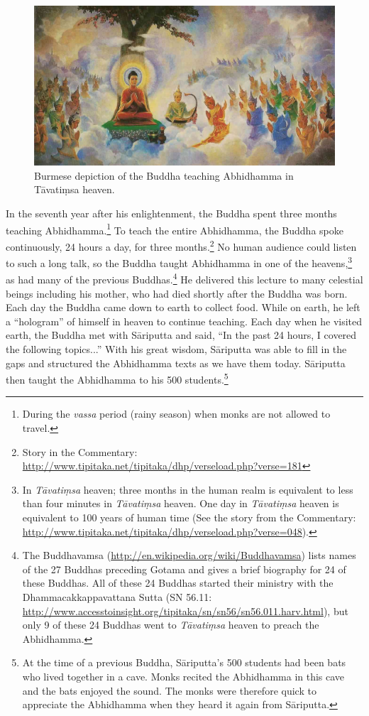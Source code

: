 \begin{figure}[h]
\centering
\includegraphics[width=0.9\linewidth]{./Diagrams/Tavatimsa}
\caption{Burmese depiction of the Buddha teaching Abhidhamma in Tāvatiṃsa heaven.}
\label{fig:Tavatimsa}
\end{figure}

In the seventh year after his enlightenment, the Buddha spent three months teaching Abhidhamma.\footnote{During the \textit{vassa} period (rainy season) when monks are not allowed to travel.} To teach the entire Abhidhamma, the Buddha spoke continuously, 24 hours a day, for three months.\footnote{Story in the Commentary: \url{http://www.tipitaka.net/tipitaka/dhp/verseload.php?verse=181}} No human audience could listen to such a long talk, so the Buddha taught Abhidhamma in one of the heavens,\footnote{In \textit{Tāvatiṃsa} heaven; three months in the human realm is equivalent to less than four minutes in \textit{Tāvatiṃsa} heaven. One day in \textit{Tāvatiṃsa} heaven is equivalent to 100 years of human time (See the story from the Commentary: \url{http://www.tipitaka.net/tipitaka/dhp/verseload.php?verse=048}).} as had many of the previous Buddhas.\footnote{The Buddhavamsa (\url{http://en.wikipedia.org/wiki/Buddhavamsa}) lists names of the 27 Buddhas preceding Gotama and gives a brief biography for 24 of these Buddhas. All of these 24 Buddhas started their ministry with the Dhammacakkappavattana Sutta (SN 56.11: \url{http://www.accesstoinsight.org/tipitaka/sn/sn56/sn56.011.harv.html}), but only 9 of these 24 Buddhas went to \textit{Tāvatiṃsa} heaven to preach the Abhidhamma.} He delivered this lecture to many celestial beings including his mother, who had died shortly after the Buddha was born. Each day the Buddha came down to earth to collect food. While on earth, he left a “hologram” of himself in heaven to continue teaching. Each day when he visited earth, the Buddha met with Sāriputta and said, “In the past 24 hours, I covered the following topics...” With his great wisdom, Sāriputta was able to fill in the gaps and structured the Abhidhamma texts as we have them today. Sāriputta then taught the Abhidhamma to his 500 students.\footnote{At the time of a previous Buddha, Sāriputta’s 500 students had been bats who lived together in a cave. Monks recited the Abhidhamma in this cave and the bats enjoyed the sound. The monks were therefore quick to appreciate the Abhidhamma when they heard it again from Sāriputta.}

